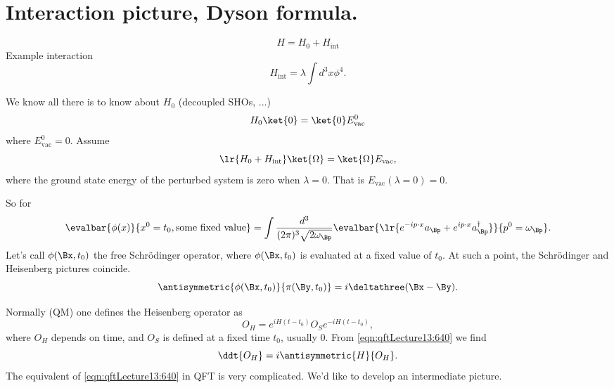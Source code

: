 \section{Interaction picture, Dyson formula.}
\begin{equation}\label{eqn:qftLecture13:520}
H = H_0 + H_{\text{int}}
\end{equation}
Example interaction
\begin{equation}\label{eqn:qftLecture13:540}
H_{\text{int}} = \lambda \int d^3 x \phi^4.
\end{equation}

We know all there is to know about \( H_0 \) (decoupled SHOs, ...)
\begin{equation}\label{eqn:qftLecture13:560}
H_0 \ket{0} = \ket{0} E^0_{\text{vac}}
\end{equation}
where \( E^0_{\text{vac}} = 0 \).  Assume
\begin{equation}\label{eqn:qftLecture13:580}
\lr{ H_0 + H_{\text{int}} } \ket{\Omega} = \ket{\Omega} E_{\text{vac}},
\end{equation}
where the ground state energy of the perturbed system is zero when \( \lambda = 0 \).  That is \( E_{\text{vac}}(\lambda = 0 ) = 0 \).

So for
\begin{equation}\label{eqn:qftLecture13:600}
\evalbar{\phi(x) }{x^0 = t_0, \text{some fixed value}}
=
\int \frac{d^3}{(2 \pi)^3 \sqrt{ 2 \omega_\Bp } }
\evalbar{
   \lr{
   e^{-i p \cdot x} a_\Bp
   + e^{i p \cdot x} a_\Bp^\dagger }
   }
{
p^0 = \omega_\Bp
}.
\end{equation}
Let's call \( \phi(\Bx, t_0) \) the free Schr\"{o}dinger operator, where
\( \phi(\Bx, t_0) \) is evaluated at a fixed value of \( t_0 \).  At such a point, the Schr\"{o}dinger and Heisenberg pictures coincide.
\begin{equation}\label{eqn:qftLecture13:620}
\antisymmetric{\phi(\Bx, t_0)}{\pi(\By, t_0)} = i \deltathree(\Bx - \By).
\end{equation}

Normally (QM) one defines the Heisenberg operator as
\begin{equation}\label{eqn:qftLecture13:640}
O_H = e^{i H(t - t_0)} O_S e^{-i H(t - t_0)},
\end{equation}
where \( O_H \) depends on time, and \( O_S \) is defined at a fixed time \( t_0 \), usually 0.
From \cref{eqn:qftLecture13:640} we find
\begin{equation}\label{eqn:qftLecture13:660}
\ddt{O_H} = i \antisymmetric{H}{O_H}.
\end{equation}
The equivalent of \cref{eqn:qftLecture13:640} in QFT is very complicated.  We'd like to develop an intermediate picture.

